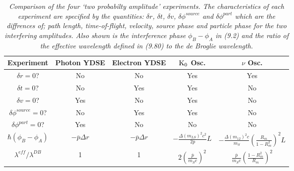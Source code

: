 {     \begin{table}
   \begin{center}
   \begin{tabular}{|c||c| c| c| c|} \hline  
   Experiment   & Photon YDSE  & Electron  YDSE  &  ${\rm K}_0$ Osc. &  $\nu $ Osc. \\
  \hline        
  \hline
   $\delta r = 0$? & No & No & Yes & Yes \\
  $\delta t = 0$? & No & Yes & Yes & No \\
 $\delta v = 0$? & Yes & No & Yes & No \\
 $\delta \phi^{source} = 0$? & No & Yes & Yes & No \\
$\delta \phi^{part} = 0$? & Yes & No & No & No \\
$\hbar(\phi_B-\phi_A)$ & $-\overline{p} \Delta r$ & $-\overline{p} \Delta r$ &
  $-\frac{\Delta(m_{LS})^2 c^2}{2 \overline{p}}L$ & $-\frac{\Delta(m_{12})^2c}{m_S}\left(\frac{R_m}{1-R_m^2}\right)^2L$  \\
$\lambda^{eff}/\lambda^{DB}$ & 1 & 1 &  $2\left(\frac{\overline{p}}{m_S c}\right)^2$ &
  $\frac{\overline{p}}{m_S c}\left(\frac{1-R_m^2}{R_m}\right)^2$    \\
 \hline
  \end{tabular}
   \caption[] {{\sl Comparison of the four `two probabilty amplitude' experiments.
 The characteristics of each experiment are specified by the quantities: $\delta r$,  $\delta t$,
   $\delta v$, $\delta \phi^{source}$ and $\delta \phi^{part}$ which are the diffrences of;
   path length, time-of-flight, velocity, source phase and particle phase for the two interfering
 amplitudes. Also shown is the interference phase $\phi_B-\phi_A$ in (9.2) and the ratio of
  the effective wavelength defined in (9.80) to the de Broglie wavelength. }} 
  \end{center}
  \end{table}    

}
